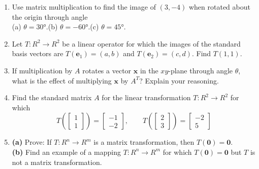 \documentclass{article}
\theoremstyle{mystyle}
\begin{document}
\begin{enumerate}
\item[37.] Use matrix multiplication to find the image of $(3,-4)$ when rotated about the origin through angle\\
(a) $\theta=30°$.\quad (b) $\theta=-60°$.\quad (c) $\theta=45°$.

\item[39.] Let $T:R^2\to R^2$ be a linear operator for which the images of the standard basis vectors are $T(\mathbf{e}_1)=(a,b)$ and $T(\mathbf{e}_2)=(c,d)$. Find $T(1,1)$.

\item[44.] If multiplication by $A$ rotates a vector $\mathbf{x}$ in the $xy$-plane through angle $\theta$, what is the effect of multiplying $\mathbf{x}$ by $A^T$? Explain your reasoning.

\item[45.] Find the standard matrix $A$ for the linear transformation $T:R^2\to R^2$ for which
\[
T\!\left(\begin{bmatrix}1\\1\end{bmatrix}\right)=\begin{bmatrix}-1\\-2\end{bmatrix},\qquad
T\!\left(\begin{bmatrix}2\\3\end{bmatrix}\right)=\begin{bmatrix}-2\\5\end{bmatrix}
\]

\item[50.] \textbf{(a)} Prove: If $T:R^n\to R^m$ is a matrix transformation, then $T(\mathbf{0})=\mathbf{0}$.\\
\textbf{(b)} Find an example of a mapping $T:R^n\to R^m$ for which $T(\mathbf{0})=\mathbf{0}$ but $T$ is not a matrix transformation.
\end{enumerate}
\end{document}
